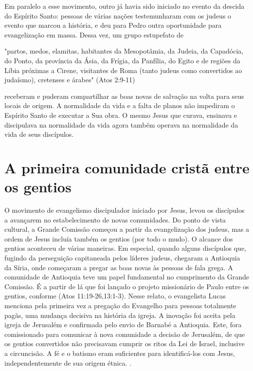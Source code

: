 \documentclass[12pt,openright,oneside,a4paper]{abntex2}
\begin{document}
Em paralelo a esse movimento, outro já havia sido iniciado no evento da descida do Espírito Santo: pessoas de várias nações testemunharam com os judeus o evento que marcou a história, e deu para Pedro outra oportunidade para evangelização em massa. Dessa vez, um grupo estupefato de 
\begin{citacao}"partos, medos, elamitas, habitantes da Mesopotâmia, da Judeia, da Capadócia, do Ponto, da província da Ásia, da Frígia, da Panfília, do Egito e de regiões da Líbia próximas a Cirene, visitantes de Roma (tanto judeus como convertidos ao judaísmo), cretenses e árabes" (Atos 2:9-11)\end{citacao} receberam e puderam compartilhar as boas novas de salvação na volta para seus locais de origem. A normalidade da vida e a falta de planos não impediram o Espírito Santo de executar a Sua obra. O mesmo Jesus que curava, ensinava e discipulava na normalidade da vida agora também operava na normalidade da vida de seus discípulos.

\section{A primeira comunidade cristã entre os gentios}

O movimento de evangelismo discipulador iniciado por Jesus, levou os discípulos a avançarem no estabelecimento de novas comunidades. Do ponto de vista cultural, a Grande Comissão começou a partir da evangelização dos judeus, mas a ordem de Jesus incluía também os gentios (por todo o mudo). O alcance dos gentios aconteceu de várias maneiras. Em especial, quando alguns discípulos que, fugindo da perseguição capitaneada pelos líderes judeus, chegaram a Antioquia da Síria, onde começaram a pregar as boas novas às pessoas de fala grega. A comunidade de Antioquia teve um papel fundamental no cumprimento da Grande Comissão. É a partir de lá que foi lançado o projeto missionário de Paulo entre os gentios, conforme (Atos 11:19-26,13:1-3). Nesse relato, o evangelista Lucas menciona pela primeira vez a pregação do Evangelho para pessoas totalmente pagãs, uma mudança decisiva na história da igreja. A inovação foi aceita pela igreja de Jerusalém e confirmada pelo envio de Barnabé a Antioquia. Este, fora comissionado para comunicar à nova comunidade a decisão de Jerusalém, de que os gentios convertidos não precisavam cumprir os ritos da Lei de Israel, inclusive a circuncisão. A fé e o batismo eram suficientes para identificá-los com Jesus, independentemente de sua origem étnica. \cite[p. 198]{green}.
\end{document}
